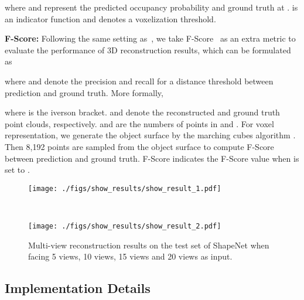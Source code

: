 \documentclass[10pt,twocolumn,letterpaper]{article}
\begin{document}
where  and  represent the predicted occupancy probability and ground truth at .  is an indicator function and  denotes a voxelization threshold.

\textbf{F-Score:} Following the same setting as~\cite{xie2020pix2vox++}, we take F-Score~\cite{tatarchenko2019single} as an extra metric to evaluate the performance of 3D reconstruction results, which can be formulated as 

where  and  denote the precision and recall for a distance threshold between prediction and ground truth. More formally, 
 


where  is the iverson bracket.  and  denote the reconstructed and ground truth point clouds, respectively.  and  are the numbers of points in  and . For voxel representation, we generate the object surface by the marching cubes algorithm \cite{lorensen1987marching}. Then 8,192 points are sampled from the object surface to compute F-Score between prediction and ground truth. F-Score indicates the F-Score value when  is set to .




\begin{figure*}[t]
    \centering
	\begin{minipage}{1\linewidth}
        \centerline{\texttt{[image: ./figs/show\_results/show\_result\_1.pdf]}}
	\end{minipage}
	\\ \vspace{0.5mm}
	\begin{minipage}{1\linewidth}
        \centerline{\texttt{[image: ./figs/show\_results/show\_result\_2.pdf]}}
	\end{minipage}
	\caption{Multi-view reconstruction results on the test set of ShapeNet when facing 5 views, 10 views, 15 views and 20 views as input.}
\label{show_results}
\end{figure*}

\subsection{Implementation Details}
\end{document}
